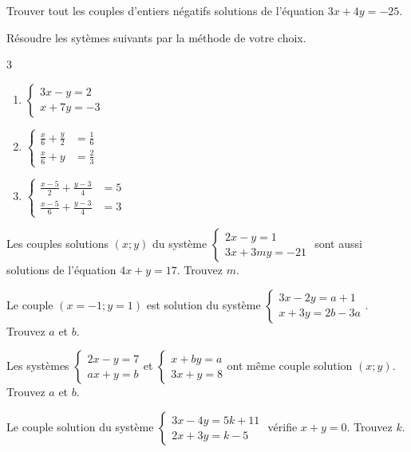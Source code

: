 \documentclass[main.tex]{subfiles}
\begin{document}
\begin{exercise} Trouver tout les couples d'entiers négatifs solutions de l'équation $3x+4y=-25$. 
\end{exercise}
\vfill 
\begin{exercise} Résoudre les sytèmes suivants par la méthode de votre choix.
	\vspace{-1em}
	\begin{multicols}{3}
		\begin{enumerate}[leftmargin =*,label={$S_\arabic*$}] 
			\item $\begin{cases}
				3x-y=2 \\x+7y=-3 
			\end{cases}$
			\item $\begin{cases}
				\tfrac{x}{6} + \tfrac{y}{2} &= \tfrac{1}{6} \\ \tfrac{x}{6} + y &= \tfrac{2}{3} 
			\end{cases}$ 
		\item $\begin{cases}
			\tfrac{x-5}{2} + \tfrac{y-3}{4} &= 5 \\ \tfrac{x-5}{6} + \tfrac{y-3}{4} &= 3
		\end{cases}$ 
		\end{enumerate}  
	\end{multicols} 
\end{exercise}
\vfill 
\vfill 
\begin{exercise} 
 Les couples solutions $(x;y)$ du système $\begin{cases}
		2x-y=1 \\3x+3my=-21 
	\end{cases}$ sont aussi solutions de l'équation $4x+y=17$. 
Trouvez $m$.
\end{exercise}
\vfill 
\newpage 
\begin{exercise} Le couple $(x=-1;y=1)$ est solution du système $\begin{cases}
		3x-2y=a+1 \\ x+3y=2b-3a 
	\end{cases}$. 
	Trouvez $a$ et $b$.
\end{exercise}
\vfill 
\begin{exercise} Les systèmes $\begin{cases}
		2x-y=7 \\ ax+y=b 
	\end{cases}$et $\begin{cases}
	x+by=a \\ 3x+y=8 
\end{cases}$ont même couple solution $(x;y)$. 
	Trouvez $a$ et $b$.
\end{exercise}
\vfill 
\begin{exercise} Le couple solution du système $\begin{cases}
		3x-4y=5k+11 \\ 2x+3y=k-5 
	\end{cases}$ vérifie $x+y=0$. Trouvez $k$.
\end{exercise}
\vfill 
%	 
\end{document}
